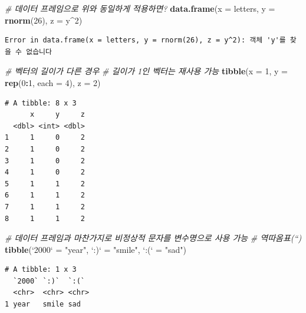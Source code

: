 \documentclass[
  11pt,
]{krantz}
\newenvironment{Shaded}{\begin{snugshade}}{\end{snugshade}}
\newcommand{\CommentTok}[1]{\textcolor[rgb]{0.37,0.37,0.37}{\textit{#1}}}
\newcommand{\DataTypeTok}[1]{\textcolor[rgb]{0.27,0.27,0.27}{#1}}
\newcommand{\DecValTok}[1]{\textcolor[rgb]{0.06,0.06,0.06}{#1}}
\newcommand{\KeywordTok}[1]{\textcolor[rgb]{0.27,0.27,0.27}{\textbf{#1}}}
\newcommand{\NormalTok}[1]{#1}
\newcommand{\OperatorTok}[1]{\textcolor[rgb]{0.43,0.43,0.43}{\textbf{#1}}}
\newcommand{\StringTok}[1]{\textcolor[rgb]{0.5,0.5,0.5}{#1}}
\begin{document}
\begin{Shaded}
\begin{Highlighting}[]
\CommentTok{# 데이터 프레임으로 위와 동일하게 적용하면?}
\KeywordTok{data.frame}\NormalTok{(}\DataTypeTok{x =}\NormalTok{ letters, }\DataTypeTok{y =} \KeywordTok{rnorm}\NormalTok{(}\DecValTok{26}\NormalTok{), }\DataTypeTok{z =}\NormalTok{ y}\OperatorTok{^}\DecValTok{2}\NormalTok{)}
\end{Highlighting}
\end{Shaded}

\begin{verbatim}
Error in data.frame(x = letters, y = rnorm(26), z = y^2): 객체 'y'를 찾을 수 없습니다
\end{verbatim}

\begin{Shaded}
\begin{Highlighting}[]
\CommentTok{# 벡터의 길이가 다른 경우}
\CommentTok{# 길이가 1인 벡터는 재사용 가능}
\KeywordTok{tibble}\NormalTok{(}\DataTypeTok{x =} \DecValTok{1}\NormalTok{, }\DataTypeTok{y =} \KeywordTok{rep}\NormalTok{(}\DecValTok{0}\OperatorTok{:}\DecValTok{1}\NormalTok{, }\DataTypeTok{each =} \DecValTok{4}\NormalTok{), }\DataTypeTok{z =} \DecValTok{2}\NormalTok{)}
\end{Highlighting}
\end{Shaded}

\begin{verbatim}
# A tibble: 8 x 3
      x     y     z
  <dbl> <int> <dbl>
1     1     0     2
2     1     0     2
3     1     0     2
4     1     0     2
5     1     1     2
6     1     1     2
7     1     1     2
8     1     1     2
\end{verbatim}

\begin{Shaded}
\begin{Highlighting}[]
\CommentTok{# 데이터 프레임과 마찬가지로 비정상적 문자를 변수명으로 사용 가능}
\CommentTok{# 역따옴표(``) }
\KeywordTok{tibble}\NormalTok{(}\StringTok{`}\DataTypeTok{2000}\StringTok{`}\NormalTok{ =}\StringTok{ "year"}\NormalTok{, }
       \StringTok{`}\DataTypeTok{:)}\StringTok{`}\NormalTok{ =}\StringTok{ "smile"}\NormalTok{, }
       \StringTok{`}\DataTypeTok{:(}\StringTok{`}\NormalTok{ =}\StringTok{ "sad"}\NormalTok{)}
\end{Highlighting}
\end{Shaded}

\begin{verbatim}
# A tibble: 1 x 3
  `2000` `:)`  `:(` 
  <chr>  <chr> <chr>
1 year   smile sad  
\end{verbatim}
\end{document}

